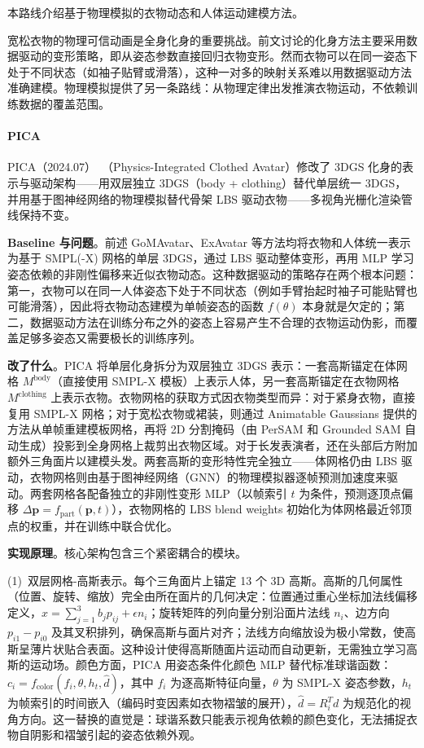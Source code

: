 本路线介绍基于物理模拟的衣物动态和人体运动建模方法。

宽松衣物的物理可信动画是全身化身的重要挑战。前文讨论的化身方法主要采用数据驱动的变形策略，即从姿态参数直接回归衣物变形。然而衣物可以在同一姿态下处于不同状态（如袖子贴臂或滑落），这种一对多的映射关系难以用数据驱动方法准确建模。物理模拟提供了另一条路线：从物理定律出发推演衣物运动，不依赖训练数据的覆盖范围。

\paragraph{PICA}

PICA（2024.07）~\cite{2407_05324}（Physics-Integrated Clothed Avatar）修改了 3DGS 化身的表示与驱动架构——用双层独立 3DGS（body + clothing）替代单层统一 3DGS，并用基于图神经网络的物理模拟替代骨架 LBS 驱动衣物——多视角光栅化渲染管线保持不变。

\textbf{Baseline 与问题}。前述 GoMAvatar、ExAvatar 等方法均将衣物和人体统一表示为基于 SMPL(-X) 网格的单层 3DGS，通过 LBS 驱动整体变形，再用 MLP 学习姿态依赖的非刚性偏移来近似衣物动态。这种数据驱动的策略存在两个根本问题：第一，衣物可以在同一人体姿态下处于不同状态（例如手臂抬起时袖子可能贴臂也可能滑落），因此将衣物动态建模为单帧姿态的函数 $f(\theta)$ 本身就是欠定的；第二，数据驱动方法在训练分布之外的姿态上容易产生不合理的衣物运动伪影，而覆盖足够多姿态又需要极长的训练序列。

\textbf{改了什么}。PICA 将单层化身拆分为双层独立 3DGS 表示：一套高斯锚定在体网格 $M^{\text{body}}$（直接使用 SMPL-X 模板）上表示人体，另一套高斯锚定在衣物网格 $M^{\text{clothing}}$ 上表示衣物。衣物网格的获取方式因衣物类型而异：对于紧身衣物，直接复用 SMPL-X 网格；对于宽松衣物或裙装，则通过 Animatable Gaussians 提供的方法从单帧重建模板网格，再将 2D 分割掩码（由 PerSAM 和 Grounded SAM 自动生成）投影到全身网格上裁剪出衣物区域。对于长发表演者，还在头部后方附加额外三角面片以建模头发。两套高斯的变形特性完全独立——体网格仍由 LBS 驱动，衣物网格则由基于图神经网络（GNN）的物理模拟器逐帧预测加速度来驱动。两套网格各配备独立的非刚性变形 MLP（以帧索引 $t$ 为条件，预测逐顶点偏移 $\Delta \mathbf{p} = f_{\text{part}}(\mathbf{p}, t)$），衣物网格的 LBS blend weights 初始化为体网格最近邻顶点的权重，并在训练中联合优化。

\textbf{实现原理}。核心架构包含三个紧密耦合的模块。

(1)~双层网格-高斯表示。每个三角面片上锚定 13 个 3D 高斯。高斯的几何属性（位置、旋转、缩放）完全由所在面片的几何决定：位置通过重心坐标加法线偏移定义，$x = \sum_{j=1}^{3} b_j p_{ij} + \epsilon n_i$；旋转矩阵的列向量分别沿面片法线 $n_i$、边方向 $p_{i1} - p_{i0}$ 及其叉积排列，确保高斯与面片对齐；法线方向缩放设为极小常数，使高斯呈薄片状贴合表面。这种设计使得高斯随面片运动而自动更新，无需独立学习高斯的运动场。颜色方面，PICA 用姿态条件化颜色 MLP 替代标准球谐函数：$c_i = f_{\text{color}}(f_i, \theta, h_t, \hat{d})$，其中 $f_i$ 为逐高斯特征向量，$\theta$ 为 SMPL-X 姿态参数，$h_t$ 为帧索引的时间嵌入（编码时变因素如衣物褶皱的展开），$\hat{d} = R_i^T d$ 为规范化的视角方向。这一替换的直觉是：球谐系数只能表示视角依赖的颜色变化，无法捕捉衣物自阴影和褶皱引起的姿态依赖外观。


